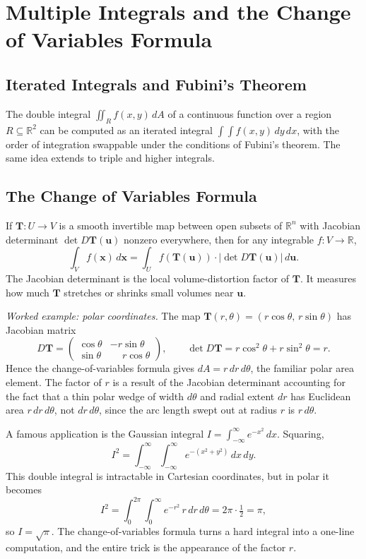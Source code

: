 \documentclass{article}
\begin{document}
\section{Multiple Integrals and the Change of Variables Formula}
 
\subsection{Iterated Integrals and Fubini's Theorem}
 
The double integral $\iint_R f(x, y)\, dA$ of a continuous function over a region $R \subseteq \mathbb{R}^2$ can be computed as an iterated integral $\int \!\!\int f(x, y)\, dy\, dx$, with the order of integration swappable under the conditions of Fubini's theorem. The same idea extends to triple and higher integrals.
 
\subsection{The Change of Variables Formula}
 
If $\mathbf{T}: U \to V$ is a smooth invertible map between open subsets of $\mathbb{R}^n$ with Jacobian determinant $\det D\mathbf{T}(\mathbf{u})$ nonzero everywhere, then for any integrable $f: V \to \mathbb{R}$,
$$\int_V f(\mathbf{x})\, d\mathbf{x} = \int_U f(\mathbf{T}(\mathbf{u})) \cdot |\det D\mathbf{T}(\mathbf{u})|\, d\mathbf{u}.$$
The Jacobian determinant is the local volume-distortion factor of $\mathbf{T}$. It measures how much $\mathbf{T}$ stretches or shrinks small volumes near $\mathbf{u}$.
 
\textit{Worked example: polar coordinates.} The map $\mathbf{T}(r, \theta) = (r\cos\theta,\, r\sin\theta)$ has Jacobian matrix
$$D\mathbf{T} = \begin{pmatrix} \cos\theta & -r\sin\theta \\ \sin\theta & \phantom{-}r\cos\theta \end{pmatrix}, \qquad \det D\mathbf{T} = r\cos^2\theta + r\sin^2\theta = r.$$
Hence the change-of-variables formula gives $dA = r\, dr\, d\theta$, the familiar polar area element. The factor of $r$ is a result of the Jacobian determinant accounting for the fact that a thin polar wedge of width $d\theta$ and radial extent $dr$ has Euclidean area $r\, dr\, d\theta$, not $dr\, d\theta$, since the arc length swept out at radius $r$ is $r\, d\theta$.
 
A famous application is the Gaussian integral $I = \int_{-\infty}^\infty e^{-x^2}\, dx$. Squaring,
$$I^2 = \int_{-\infty}^\infty\!\!\int_{-\infty}^\infty e^{-(x^2 + y^2)}\, dx\, dy.$$
This double integral is intractable in Cartesian coordinates, but in polar it becomes
$$I^2 = \int_0^{2\pi}\!\!\int_0^\infty e^{-r^2}\, r\, dr\, d\theta = 2\pi \cdot \tfrac{1}{2} = \pi,$$
so $I = \sqrt{\pi}$. The change-of-variables formula turns a hard integral into a one-line computation, and the entire trick is the appearance of the factor $r$.
\end{document}
